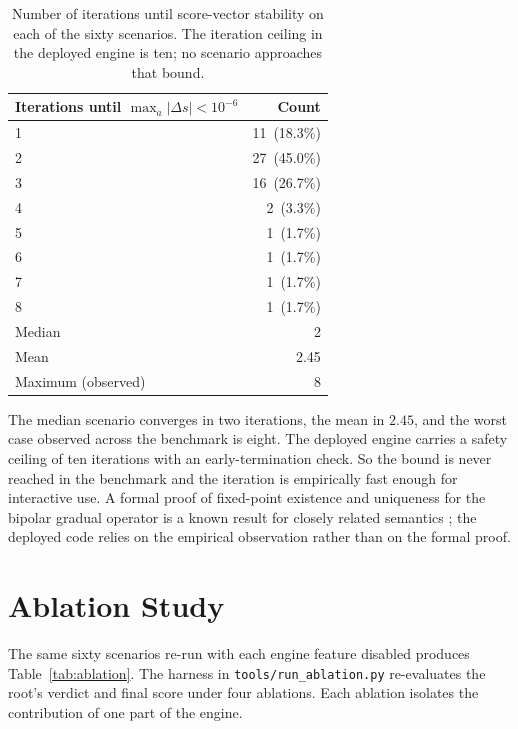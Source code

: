 \begin{table}[h]
\centering
\caption{Number of iterations until score-vector stability on each of the sixty scenarios. The iteration ceiling in the deployed engine is ten; no scenario approaches that bound.}
\label{tab:convergence}
\begin{tabular}{lr}
\toprule
Iterations until $\max_a |\Delta s| < 10^{-6}$ & Count \\
\midrule
1   & 11 \,(18.3\%) \\
2   & 27 \,(45.0\%) \\
3   & 16 \,(26.7\%) \\
4   & \phantom{0}2 \,(3.3\%) \\
5   & \phantom{0}1 \,(1.7\%) \\
6   & \phantom{0}1 \,(1.7\%) \\
7   & \phantom{0}1 \,(1.7\%) \\
8   & \phantom{0}1 \,(1.7\%) \\
\midrule
Median & 2 \\
Mean   & 2.45 \\
Maximum (observed) & 8 \\
\bottomrule
\end{tabular}
\end{table}

\noindent The median scenario converges in two iterations, the mean in $2.45$, and the worst case observed across the benchmark is eight. The deployed engine carries a safety ceiling of ten iterations with an early-termination check. So the bound is never reached in the benchmark and the iteration is empirically fast enough for interactive use. A formal proof of fixed-point existence and uniqueness for the bipolar gradual operator is a known result for closely related semantics \cite{cayrol2005graduality, amgoud2017acceptability}; the deployed code relies on the empirical observation rather than on the formal proof.

\section{Ablation Study}
\label{sec:eval_ablation}
The same sixty scenarios re-run with each engine feature disabled produces Table~\ref{tab:ablation}. The harness in \texttt{tools/run\_ablation.py} re-evaluates the root's verdict and final score under four ablations. Each ablation isolates the contribution of one part of the engine.

